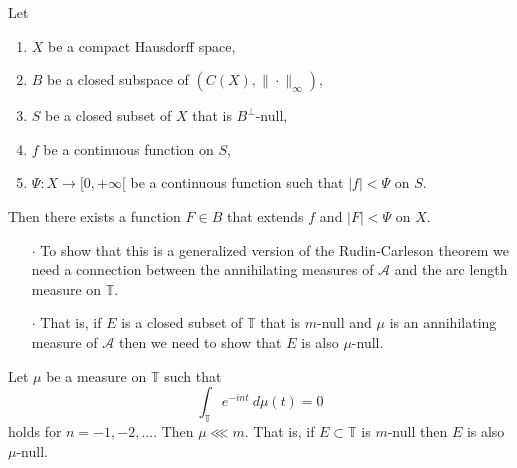\documentclass{beamer}
\begin{document}
\begin{frame}
\begin{theorem}[Bishop (1962)]
Let
\begin{enumerate}
\item $X$ be a compact Hausdorff space,
\item $B$ be a closed subspace of $(C(X), \| \cdot \|_{\infty})$,
\item $S$ be a closed subset of $X$ that is $B^{\perp}$-null,
\item $f$ be a continuous function on $S$,
\item $\Psi: X \rightarrow [0, +\infty[$ be a continuous function such that $|f| < \Psi$ on $S$.
\end{enumerate}
Then there exists a function $F \in B$ that extends $f$ and $|F| < \Psi$ on $X$. \\
\end{theorem}
\end{frame}

\begin{frame}
\begin{enumerate}
\item[$\cdot$] To show that this is a generalized version of the Rudin-Carleson theorem we need a connection between the annihilating measures of $\mathcal{A}$ and the arc length measure on $\mathbb{T}$.
\item[$\cdot$] That is, if $E$ is a closed subset of $\mathbb{T}$ that is $m$-null and $\mu$ is an annihilating measure of $\mathcal{A}$ then we need to show that $E$ is also $\mu$-null.
\end{enumerate}
\end{frame}

\begin{frame}
\begin{theorem}
Let $\mu$ be a measure on $\mathbb{T}$ such that
\[
	\int_{\mathbb{T}} e^{-int}\ d\mu(t) = 0
\]
holds for $n = -1, -2, ...$.
Then $\mu \lll m$.
That is, if $E \subset \mathbb{T}$ is $m$-null then $E$ is also $\mu$-null.\\
\vspace{1em}
\end{theorem}
\end{frame}
\end{document}
